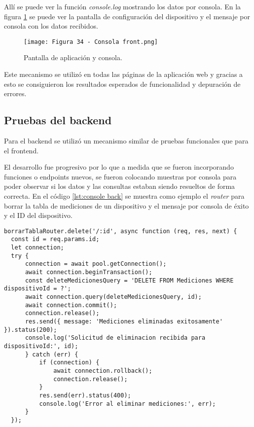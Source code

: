 Allí se puede ver la función \textit{console.log} mostrando los datos por consola. En la figura \ref{fig:34} se puede ver la pantalla de configuración del dispositivo y el mensaje por consola con los datos recibidos.

\begin{figure}[h]
\centering
\texttt{[image: Figura 34 - Consola front.png]}
\caption[Prueba frontend]{Pantalla de aplicación y consola.}
\label{fig:34}
\end{figure}

Este mecanismo se utilizó en todas las páginas de la aplicación web y gracias a esto se consiguieron los resultados esperados de funcionalidad y depuración de errores.

\subsection{Pruebas del backend}

Para el backend se utilizó un mecanismo similar de pruebas funcionales que para el frontend.

El desarrollo fue progresivo por lo que a medida que se fueron incorporando funciones o endpoints nuevos, se fueron colocando muestras por consola para poder observar si los datos y las consultas estaban siendo resueltos de forma correcta. En el código \ref{lst:console back} se muestra como ejemplo el \textit{router} para borrar la tabla de mediciones de un dispositivo y el mensaje por consola de éxito y el ID del dispositivo.

\begin{lstlisting}[caption={Muestra por consola de los datos consultados}, label={lst:console back}]
borrarTablaRouter.delete('/:id', async function (req, res, next) {
  const id = req.params.id;
  let connection;
  try {
      connection = await pool.getConnection();
      await connection.beginTransaction();
      const deleteMedicionesQuery = 'DELETE FROM Mediciones WHERE dispositivoId = ?';
      await connection.query(deleteMedicionesQuery, id);
      await connection.commit();
      connection.release();
      res.send({ message: 'Mediciones eliminadas exitosamente' }).status(200);
      console.log('Solicitud de eliminacion recibida para dispositivoId:', id);
      } catch (err) {
          if (connection) {
              await connection.rollback();
              connection.release();
          }
          res.send(err).status(400);
          console.log('Error al eliminar mediciones:', err);
      }
  });
\end{lstlisting}

